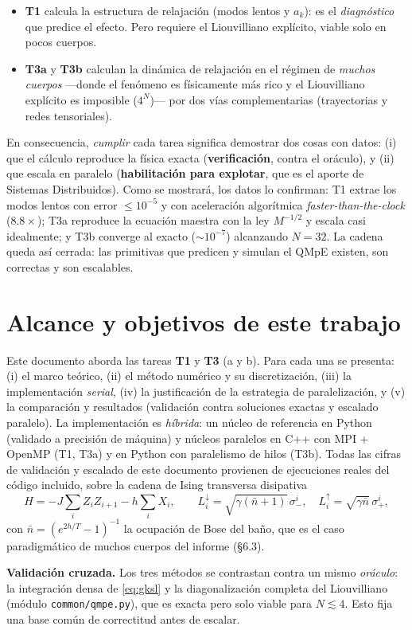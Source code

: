 \begin{itemize}
  \item \textbf{T1} calcula la estructura de relajación (modos lentos y $a_k$): es
  el \emph{diagnóstico} que predice el efecto. Pero requiere el Liouvilliano
  explícito, viable solo en pocos cuerpos.
  \item \textbf{T3a} y \textbf{T3b} calculan la dinámica de relajación en el
  régimen de \emph{muchos cuerpos} ---donde el fenómeno es físicamente más rico y
  el Liouvilliano explícito es imposible ($4^N$)--- por dos vías complementarias
  (trayectorias y redes tensoriales).
\end{itemize}

En consecuencia, \emph{cumplir} cada tarea significa demostrar dos cosas con datos:
(i) que el cálculo reproduce la física exacta (\textbf{verificación}, contra el
oráculo), y (ii) que escala en paralelo (\textbf{habilitación para explotar}, que
es el aporte de Sistemas Distribuidos). Como se mostrará, los datos lo confirman:
T1 extrae los modos lentos con error $\le10^{-5}$ y con aceleración algorítmica
\emph{faster-than-the-clock} ($8.8\times$); T3a reproduce la ecuación maestra con
la ley $M^{-1/2}$ y escala casi idealmente; y T3b converge al exacto
($\sim10^{-7}$) alcanzando $N=32$. La cadena queda así cerrada: las primitivas
que predicen y simulan el QMpE existen, son correctas y son escalables.

\section{Alcance y objetivos de este trabajo}

Este documento aborda las tareas \textbf{T1} y \textbf{T3} (a y b). Para cada una
se presenta: (i) el marco teórico, (ii) el método numérico y su discretización,
(iii) la implementación \emph{serial}, (iv) la justificación de la estrategia de
paralelización, y (v) la comparación y resultados (validación contra soluciones
exactas y escalado paralelo). La implementación es \emph{híbrida}: un núcleo de
referencia en Python (validado a precisión de máquina) y núcleos paralelos en
C++ con MPI + OpenMP (T1, T3a) y en Python con paralelismo de hilos (T3b). Todas
las cifras de validación y escalado de este documento provienen de ejecuciones
reales del código incluido, sobre la cadena de Ising transversa disipativa
\begin{equation}
    H = -J\sum_{i} Z_i Z_{i+1} - h\sum_i X_i, \qquad
    L_i^{\downarrow}=\sqrt{\gamma(\bar n+1)}\,\sigma_-^i,\quad
    L_i^{\uparrow}=\sqrt{\gamma\bar n}\,\sigma_+^i,
    \label{eq:ising}
\end{equation}
con $\bar n = (e^{2h/T}-1)^{-1}$ la ocupación de Bose del baño, que es el caso
paradigmático de muchos cuerpos del informe (\S 6.3).

\medskip
\noindent\textbf{Validación cruzada.} Los tres métodos se contrastan contra un
mismo \emph{oráculo}: la integración densa de \cref{eq:gksl} y la diagonalización
completa del Liouvilliano (módulo \texttt{common/qmpe.py}), que es exacta pero
solo viable para $N\lesssim 4$. Esto fija una base común de correctitud antes de
escalar.
